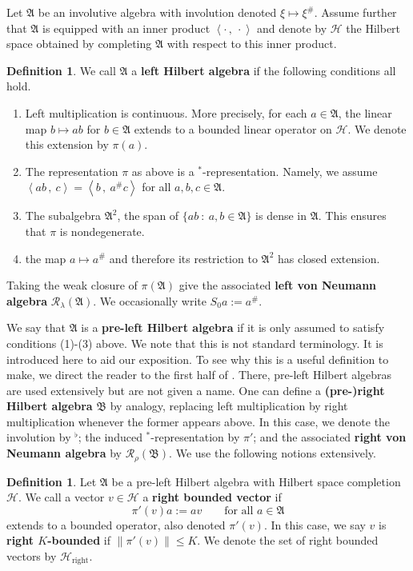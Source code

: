 \documentclass[12pt]{amsart}
\theoremstyle{definition}
\newtheorem{defn}[thm]{Definition}
\def\cal{\mathcal}
\newcommand\ip[2]{\left\langle #1\, ,\!\ #2 \right\rangle}
\newcommand\R{{\cal R}}
\def \rt{\operatorname{right}}
\begin{document}
Let $\mathfrak{A}$ be an involutive algebra with involution denoted $\xi \mapsto \xi^\#$.  Assume further that $\mathfrak{A}$ is equipped with an inner product $\ip{\cdot}{\cdot}$ and denote by $\cal H$ the Hilbert space obtained by completing $\mathfrak{A}$ with respect to this inner product.

\begin{defn}\label{DefLeftHilbert}
     We call $\mathfrak{A}$ a \textbf{left Hilbert algebra} if the following conditions all hold.
    \begin{enumerate}
        \item Left multiplication is continuous.  More precisely, for each $a \in \mathfrak{A}$, the linear map $b \mapsto ab$ for $b \in \mathfrak{A}$ extends to a bounded linear operator on $\cal H$.  We denote this extension by $\pi(a)$.
        \item The representation $\pi$ as above is a $^*$-representation.  Namely, we assume $\ip{a b}{c} = \ip{b}{a^\# c}$ for all $a,b,c \in \mathfrak{A}$.
        \item The subalgebra $\mathfrak{A}^2$, the span of $\{ ab \ : \ a,b \in \mathfrak{A}\}$ is dense in $\mathfrak{A}$.  This ensures that $\pi$ is nondegenerate.
        \item the map $a \mapsto a^\#$ and therefore its restriction to $\mathfrak{A}^2$ has closed extension.
    \end{enumerate}
    Taking the weak closure of $\pi(\mathfrak{A})$ give the associated \textbf{left von Neumann algebra} $\R_{\lambda}(\mathfrak{A})$.  We occasionally write $S_0 a := a^\#$.
\end{defn}

We say that $\mathfrak{A}$ is a \textbf{pre-left Hilbert algebra} if it is only assumed to satisfy conditions (1)-(3) above.  We note that this is not standard terminology.  It is introduced here to aid our exposition.  To see why this is a useful definition to make, we direct the reader to the first half of \cite[Section 5]{RvD}.  There, pre-left Hilbert algebras are used extensively but are not given a name.  One can define a \textbf{(pre-)right Hilbert algebra} $\mathfrak{B}$ by analogy, replacing left multiplication by right multiplication whenever the former appears above.  In this case, we  denote the involution by $^\flat$; the induced $^*$-representation by $\pi'$; and the associated \textbf{right  von Neumann algebra} by $\R_{\rho}(\mathfrak{B})$.  We use the following notions extensively.

\begin{defn}
    Let $\mathfrak{A}$ be a pre-left Hilbert algebra with Hilbert space completion $\cal H$.  We call a vector $v \in \cal H$ a \textbf{right bounded vector} if
    \[
    \pi'(v)a := av \qquad \text{for all } a \in \mathfrak{A}
    \]
    extends to a bounded operator, also denoted $\pi'(v)$.  In this case, we say $v$ is \textbf{right $K$-bounded} if $\|\pi'(v)\| \leq K$.  We denote the set of right bounded vectors by $\cal H_{\rt}$.
\end{defn}
\end{document}
